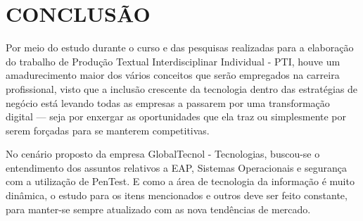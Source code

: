 
\chapter{CONCLUSÃO}
\label{chap:conclusao}

Por meio do estudo durante o curso e das pesquisas realizadas para a elaboração do trabalho de Produção Textual Interdisciplinar Individual - PTI, houve um amadurecimento maior dos vários conceitos que serão empregados na carreira profissional, visto que  a inclusão crescente da tecnologia dentro das estratégias de negócio está levando todas as empresas a passarem por uma transformação digital — seja por enxergar as oportunidades que ela traz ou simplesmente por serem forçadas para se manterem competitivas.

No cenário proposto da empresa GlobalTecnol - Tecnologias, buscou-se o entendimento dos assuntos relativos a EAP, Sistemas Operacionais e segurança com a utilização de PenTest. E como a área de tecnologia da informação é muito dinâmica, o estudo para os itens mencionados e outros deve ser feito constante, para manter-se sempre atualizado com as nova tendências de mercado.
